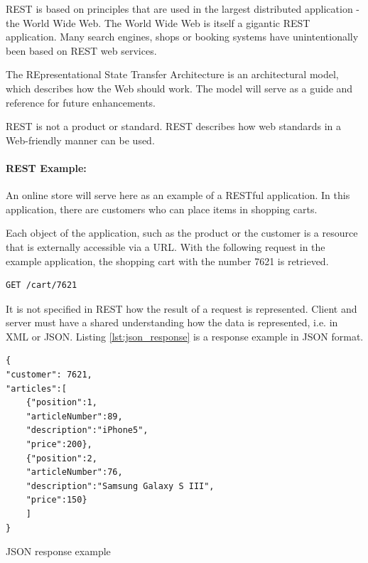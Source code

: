REST is based on principles that are used in the largest distributed application - the World Wide Web. The World Wide Web is itself a gigantic REST application. Many search engines, shops or booking systems have unintentionally been based on REST web services.

The REpresentational State Transfer Architecture is an architectural model, which describes how the Web should work. The model will serve as a guide and reference for future enhancements.

REST is not a product or standard. REST describes how web standards in a Web-friendly manner can be used.


\paragraph{REST Example:} An online store will serve here as an example of a RESTful application. In this application, there are customers who can place items in shopping carts.

Each object of the application, such as the product or the customer is a resource that is externally accessible via a URL. With the following request in the example application, the shopping cart with the number 7621 is retrieved.

\begin{code}
\begin{verbatim}
GET /cart/7621
\end{verbatim}
\end{code}


It is not specified in REST how the result of a request is represented. Client and server must have a shared understanding how the data is represented, i.e. in XML or JSON. Listing \ref{lst:json_response} is a response example in JSON format.

\begin{code}
\begin{verbatim}
{
"customer": 7621,
"articles":[
	{"position":1,
	"articleNumber":89,
	"description":"iPhone5",
	"price":200},
	{"position":2,
	"articleNumber":76,
	"description":"Samsung Galaxy S III",
	"price":150}
	]
}
\end{verbatim}
\caption{JSON response example}
\label{lst:json_response}
\end{code}

